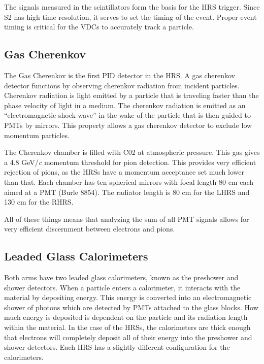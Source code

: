 The signals measured in the scintillators form the basis for the HRS trigger. Since S2 has high time resolution, it serves to set the timing of the event. Proper event timing is critical for the VDCs to accurately track a particle.

\subsection{Gas Cherenkov}

The Gas Cherenkov is the first PID detector in the HRS. A gas cherenkov detector functions by observing cherenkov radiation from incident particles. Cherenkov radiation is light emitted by a particle that is traveling faster than the phase velocity of light in a medium. The cherenkov radiation is emitted as an ``electromagnetic shock wave'' in the wake of the particle that is then guided to PMTs by mirrors. This property allows a gas cherenkov detector to exclude low momentum particles.\cite{Leo}

The Cherenkov chamber is filled with C02 at atmospheric pressure. This gas gives a 4.8 GeV/\textit{c}  momentum threshold for pion detection. This provides very efficient rejection of pions, as the HRSs have a momentum acceptance set much lower than that. Each chamber has ten spherical mirrors with focal length 80 cm each aimed at a PMT (Burle 8854). The radiator length is 80 cm for the LHRS and 130 cm for the RHRS.

All of these things means that analyzing the sum of all PMT signals allows for very efficient discernment between electrons and pions.

\subsection{Leaded Glass Calorimeters}

Both arms have two leaded glass calorimeters, known as the preshower and shower detectors. When a particle enters a calorimeter, it interacts with the material by depositing energy. This energy is converted into an electromagnetic shower of photons which are detected by PMTs attached to the glass blocks. How much energy is deposited is dependent on the particle and its radiation length within the material. In the case of the HRSs, the calorimeters are thick enough that electrons will completely deposit all of their energy into the preshower and shower detectors. Each HRS has a slightly different configuration for the calorimeters.

